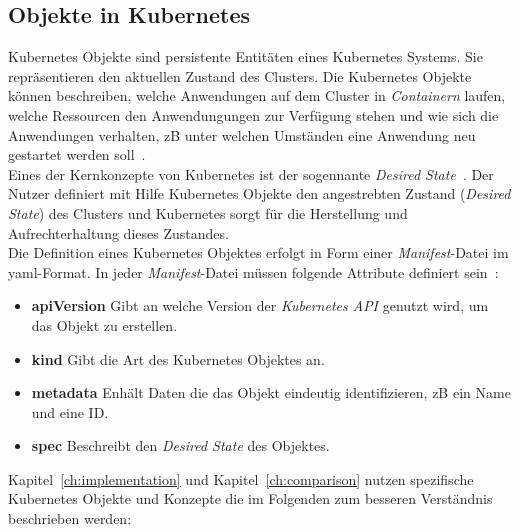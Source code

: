 \subsection{Objekte in Kubernetes}

Kubernetes Objekte sind persistente Entitäten eines Kubernetes Systems. Sie repräsentieren den aktuellen Zustand des Clusters.
Die Kubernetes Objekte können beschreiben, welche Anwendungen auf dem Cluster in \textit{Containern} laufen,
welche Ressourcen den Anwendungungen zur Verfügung stehen und
wie sich die Anwendungen verhalten, \ac{zB} unter welchen Umständen eine Anwendung neu gestartet werden soll~\cite{kubernetes-objects}.
\\
Eines der Kernkonzepte von Kubernetes ist der sogennante \textit{Desired State}~\cite{kubernetes-objects-kodekloud}.
Der Nutzer definiert mit Hilfe Kubernetes Objekte den angestrebten Zustand (\textit{Desired State}) des Clusters und Kubernetes
sorgt für die Herstellung und Aufrechterhaltung dieses Zustandes.
\\
Die Definition eines Kubernetes Objektes erfolgt in Form einer \textit{Manifest}-Datei im \ac{yaml}-Format.
In jeder \textit{Manifest}-Datei müssen folgende Attribute definiert sein~\cite{kubernetes-objects}:

\begin{itemize}
      \setlength\itemsep{-0.5cm}
      \item
            \textbf{apiVersion} Gibt an welche Version der \textit{Kubernetes API} genutzt wird, um das Objekt zu erstellen.
      \item
            \textbf{kind}  Gibt die Art des Kubernetes Objektes an.
      \item
            \textbf{metadata}  Enhält Daten die das Objekt eindeutig identifizieren, \ac{zB} ein Name und eine ID\@.
      \item
            \textbf{spec} Beschreibt den \textit{Desired State} des Objektes.
\end{itemize}

Kapitel~\ref{ch:implementation} und Kapitel~\ref{ch:comparison} nutzen spezifische Kubernetes Objekte und Konzepte die im Folgenden
zum besseren Verständnis beschrieben werden:

